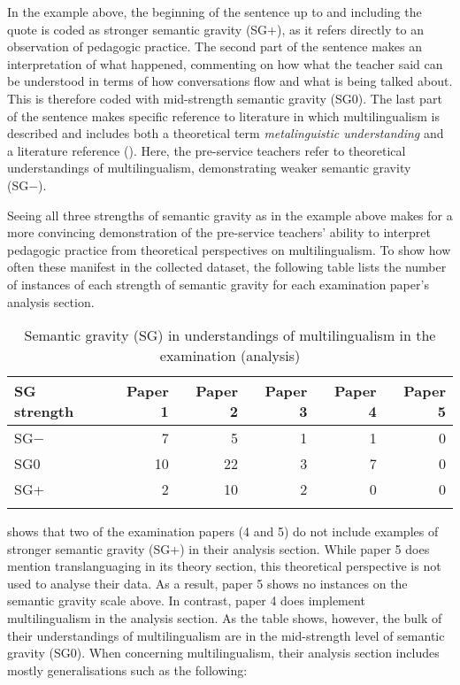 \documentclass[output=paper]{langscibook}
\begin{document}
In the example above, the beginning of the sentence up to and including the quote is coded as stronger semantic gravity (SG+), as it refers directly to an observation of pedagogic practice. The second part of the sentence makes an interpretation of what happened, commenting on how what the teacher said can be understood in terms of how conversations flow and what is being talked about. This is therefore coded with mid-strength semantic gravity (SG0). The last part of the sentence makes specific reference to literature in which multilingualism is described and includes both a theoretical term \textit{metalinguistic understanding} and a literature reference (\citealt{KnudsenWulff2021}). Here, the pre-service teachers refer to theoretical understandings of multilingualism, demonstrating weaker semantic gravity (SG−).

Seeing all three strengths of semantic gravity as in the example above makes for a more convincing demonstration of the pre-service teachers’ ability to interpret pedagogic practice from theoretical perspectives on multilingualism. To show how often these manifest in the collected dataset, the following table lists the number of instances of each strength of semantic gravity for each examination paper’s analysis section.

\begin{table}
\begin{tabular}{l *5{r}}
\lsptoprule
SG strength &  Paper 1  &  Paper 2  & Paper 3  & Paper 4 & Paper 5\\\midrule
SG− & 7 & 5 & 1 & 1 & 0\\
SG0 & 10 & 22 & 3 & 7 & 0\\
SG+ & 2 & 10 & 2 & 0 & 0\\
\lspbottomrule
\end{tabular}
\caption{Semantic gravity (SG) in understandings of multilingualism in the examination (analysis)}
\label{tab:ostergaard:2}
\end{table}

 shows that two of the examination papers (4 and 5) do not include examples of stronger semantic gravity (SG+) in their analysis section. While paper 5 does mention translanguaging in its theory section, this theoretical perspective is not used to analyse their data. As a result, paper 5 shows no instances on the semantic gravity scale above. In contrast, paper 4 does implement multilingualism in the analysis section. As the table shows, however, the bulk of their understandings of multilingualism are in the mid-strength level of semantic gravity (SG0). When concerning multilingualism, their analysis section includes mostly generalisations such as the following:
\end{document}
